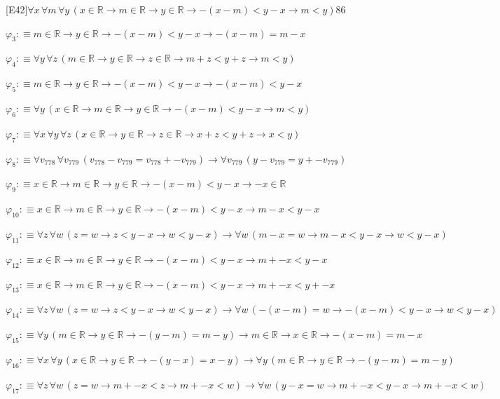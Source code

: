 \begin{fullproof}{[E42]}{$\forall x\,\forall m\,\forall y\,(x \in \mathbb{R} \to m \in \mathbb{R} \to y \in \mathbb{R} \to -(x - m) < y - x \to m < y)$}{86}
\begin{abbrevlist}
\item $\varphi_{3} :\equiv m \in \mathbb{R} \to y \in \mathbb{R} \to -(x - m) < y - x \to -(x - m) = m - x$
\item $\varphi_{4} :\equiv \forall y\,\forall z\,(m \in \mathbb{R} \to y \in \mathbb{R} \to z \in \mathbb{R} \to m + z < y + z \to m < y)$
\item $\varphi_{5} :\equiv m \in \mathbb{R} \to y \in \mathbb{R} \to -(x - m) < y - x \to -(x - m) < y - x$
\item $\varphi_{6} :\equiv \forall y\,(x \in \mathbb{R} \to m \in \mathbb{R} \to y \in \mathbb{R} \to -(x - m) < y - x \to m < y)$
\item $\varphi_{7} :\equiv \forall x\,\forall y\,\forall z\,(x \in \mathbb{R} \to y \in \mathbb{R} \to z \in \mathbb{R} \to x + z < y + z \to x < y)$
\item $\varphi_{8} :\equiv \forall v_{778}\,\forall v_{779}\,(v_{778} - v_{779} = v_{778} + -v_{779}) \to \forall v_{779}\,(y - v_{779} = y + -v_{779})$
\item $\varphi_{9} :\equiv x \in \mathbb{R} \to m \in \mathbb{R} \to y \in \mathbb{R} \to -(x - m) < y - x \to -x \in \mathbb{R}$
\item $\varphi_{10} :\equiv x \in \mathbb{R} \to m \in \mathbb{R} \to y \in \mathbb{R} \to -(x - m) < y - x \to m - x < y - x$
\item $\varphi_{11} :\equiv \forall z\,\forall w\,(z = w \to z < y - x \to w < y - x) \to \forall w\,(m - x = w \to m - x < y - x \to w < y - x)$
\item $\varphi_{12} :\equiv x \in \mathbb{R} \to m \in \mathbb{R} \to y \in \mathbb{R} \to -(x - m) < y - x \to m + -x < y - x$
\item $\varphi_{13} :\equiv x \in \mathbb{R} \to m \in \mathbb{R} \to y \in \mathbb{R} \to -(x - m) < y - x \to m + -x < y + -x$
\item $\varphi_{14} :\equiv \forall z\,\forall w\,(z = w \to z < y - x \to w < y - x) \to \forall w\,(-(x - m) = w \to -(x - m) < y - x \to w < y - x)$
\item $\varphi_{15} :\equiv \forall y\,(m \in \mathbb{R} \to y \in \mathbb{R} \to -(y - m) = m - y) \to m \in \mathbb{R} \to x \in \mathbb{R} \to -(x - m) = m - x$
\item $\varphi_{16} :\equiv \forall x\,\forall y\,(x \in \mathbb{R} \to y \in \mathbb{R} \to -(y - x) = x - y) \to \forall y\,(m \in \mathbb{R} \to y \in \mathbb{R} \to -(y - m) = m - y)$
\item $\varphi_{17} :\equiv \forall z\,\forall w\,(z = w \to m + -x < z \to m + -x < w) \to \forall w\,(y - x = w \to m + -x < y - x \to m + -x < w)$

\end{abbrevlist}
\end{fullproof}
